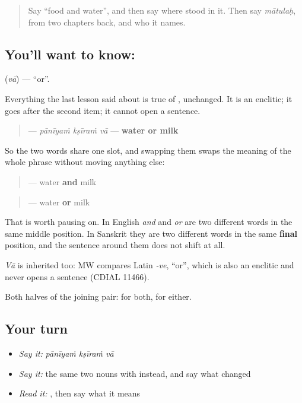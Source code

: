 \begin{quote}
Say \textquotedblleft{}food and water\textquotedblright{}, and then say where \textbf{} stood in it. Then say \emph{mātulaḥ}, from two chapters back, and who it names.
\end{quote}

\subsection*{You'll want to know: }
\textbf{} (\emph{vā}) — \textquotedblleft{}or\textquotedblright{}.

Everything the last lesson said about \textbf{} is true of \textbf{}, unchanged. It is an enclitic; it goes after the second item; it cannot open a sentence.

\begin{quote}
\textbf{  } — \emph{pānīyaṁ kṣīraṁ vā} — \textbf{water or milk}
\end{quote}

So the two words share one slot, and swapping them swaps the meaning of the whole phrase without moving anything else:

\begin{quote}
\textbf{  } — water \textbf{and} milk
\end{quote}

\begin{quote}
\textbf{  } — water \textbf{or} milk
\end{quote}

That is worth pausing on. In English \emph{and} and \emph{or} are two different words in the same middle position. In Sanskrit they are two different words in the same \textbf{final} position, and the sentence around them does not shift at all.

\begin{cousinweb}
\emph{Vā} is inherited too: MW compares Latin \emph{-ve}, \textquotedblleft{}or\textquotedblright{}, which is also an enclitic and never opens a sentence (CDIAL 11466).
\end{cousinweb}

\begin{grammarlens}[title={What you've built}]
Both halves of the joining pair: \textbf{} for both, \textbf{} for either.
\end{grammarlens}

\subsection*{Your turn}
\begin{itemize}
\raggedright
  \item \emph{Say it:} \emph{pānīyaṁ kṣīraṁ vā}
  \item \emph{Say it:} the same two nouns with \textbf{} instead, and say what changed
  \item \emph{Read it:} \textbf{  }, then say what it means
\end{itemize}

